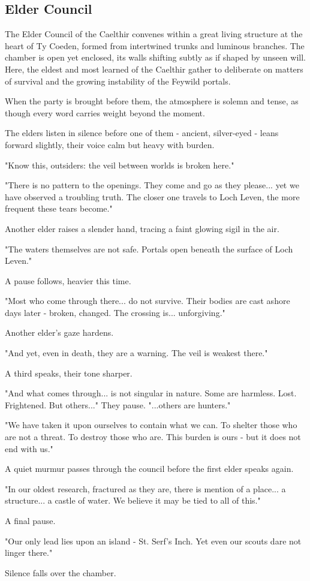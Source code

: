 \subsection*{Elder Council}
{\entryfont The Elder Council of the Caelthir convenes within a great living structure at the heart of Ty Coeden, formed from intertwined trunks and luminous branches. The chamber is open yet enclosed, its walls shifting subtly as if shaped by unseen will. Here, the eldest and most learned of the Caelthir gather to deliberate on matters of survival and the growing instability of the Feywild portals.

When the party is brought before them, the atmosphere is solemn and tense, as though every word carries weight beyond the moment.}
\begin{DndReadAloud}
	The elders listen in silence before one of them - ancient, silver-eyed - leans forward slightly, their voice calm but heavy with burden.

	"Know this, outsiders: the veil between worlds is broken here."

	"There is no pattern to the openings. They come and go as they please... yet we have observed a troubling truth. The closer one travels to Loch Leven, the more frequent these tears become."

	Another elder raises a slender hand, tracing a faint glowing sigil in the air.

	"The waters themselves are not safe. Portals open beneath the surface of Loch Leven."

	A pause follows, heavier this time.

	"Most who come through there... do not survive. Their bodies are cast ashore days later - broken, changed. The crossing is... unforgiving."

	Another elder's gaze hardens.

	"And yet, even in death, they are a warning. The veil is weakest there."

	A third speaks, their tone sharper.

	"And what comes through... is not singular in nature. Some are harmless. Lost. Frightened. But others..."
	They pause.
	"...others are hunters."

	"We have taken it upon ourselves to contain what we can. To shelter those who are not a threat. To destroy those who are. This burden is ours - but it does not end with us."

	A quiet murmur passes through the council before the first elder speaks again.

	"In our oldest research, fractured as they are, there is mention of a place... a structure... a castle of water. We believe it may be tied to all of this."

	A final pause.

	"Our only lead lies upon an island - St. Serf's Inch. Yet even our scouts dare not linger there."

	Silence falls over the chamber.
\end{DndReadAloud}
